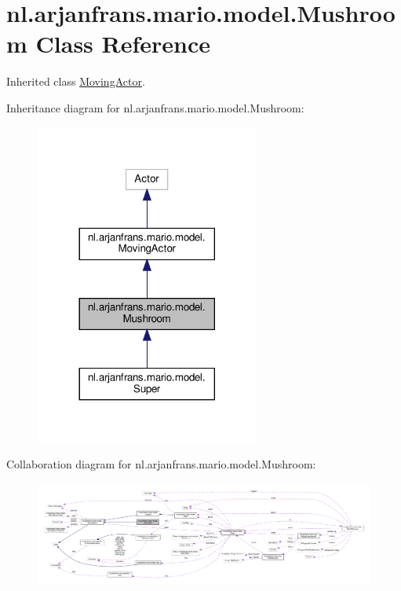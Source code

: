 \hypertarget{classnl_1_1arjanfrans_1_1mario_1_1model_1_1Mushroom}{}\section{nl.\+arjanfrans.\+mario.\+model.\+Mushroom Class Reference}
\label{classnl_1_1arjanfrans_1_1mario_1_1model_1_1Mushroom}


Inherited class \hyperlink{classnl_1_1arjanfrans_1_1mario_1_1model_1_1MovingActor}{Moving\+Actor}.  




Inheritance diagram for nl.\+arjanfrans.\+mario.\+model.\+Mushroom\+:
\nopagebreak
\begin{figure}[H]
\begin{center}
\leavevmode
\includegraphics[width=209pt]{classnl_1_1arjanfrans_1_1mario_1_1model_1_1Mushroom__inherit__graph}
\end{center}
\end{figure}


Collaboration diagram for nl.\+arjanfrans.\+mario.\+model.\+Mushroom\+:
\nopagebreak
\begin{figure}[H]
\begin{center}
\leavevmode
\includegraphics[width=350pt]{classnl_1_1arjanfrans_1_1mario_1_1model_1_1Mushroom__coll__graph}
\end{center}
\end{figure}
